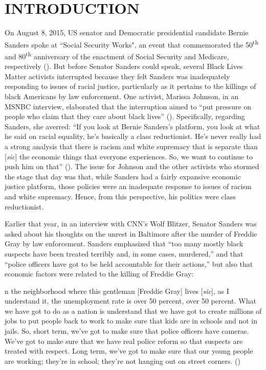 \documentclass[12pt]{article}
\renewenvironment{quote}
  {\list{}{\leftmargin=\parindent\rightmargin=0pt}%
   \item\relax}
  {\endlist}
\begin{document}

\section{INTRODUCTION}

On August 8, 2015, US senator and Democratic presidential candidate Bernie Sanders spoke at ``Social Security Works", an event that commemorated the 50\textsuperscript{th} and 80\textsuperscript{th} anniversary of the enactment of Social Security and Medicare, respectively (\cite{wilsonProtestersShutBernie2015}). But before Senator Sanders could speak, several Black Lives Matter activists interrupted because they felt Sanders was inadequately responding to issues of racial justice, particularly as it pertains to the killings of black Americans by law enforcement. One activist, Marissa Johnson, in an MSNBC interview, elaborated that the interruption aimed to “put pressure on people who claim that they care about black lives” (\cite{hallBernieSandersBlack2015}). Specifically, regarding Sanders, she averred: “If you look at Bernie Sanders’s platform, you look at what he said on racial equality, he’s basically a class reductionist. He’s never really had a strong analysis that there is racism and white supremacy that is separate than [\textit{sic}] the economic things that everyone experiences. So, we want to continue to push him on that” (\cite{hallBernieSandersBlack2015}). The issue for Johnson and the other activists who stormed the stage that day was that, while Sanders had a fairly expansive economic justice platform, those policies were an inadequate response to issues of racism and white supremacy. Hence, from this perspective, his politics were class reductionist.

Earlier that year, in an interview with CNN’s Wolf Blitzer, Senator Sanders was asked about his thoughts on the unrest in Baltimore after the murder of Freddie Gray by law enforcement. Sanders emphasized that “too many mostly black suspects have been treated terribly and, in some cases, murdered,” and that “police officers have got to be held accountable for their actions,” but also that economic factors were related to the killing of Freddie Gray:

\begin{quote}
[I]n the neighborhood where this gentleman [Freddie Gray] lives [\textit{sic}], as I understand it, the unemployment rate is over 50 percent, over 50 percent. What we have got to do as a nation is understand that we have got to create millions of jobs to put people back to work to make sure that kids are in schools and not in jails. So, short term, we've got to make sure that police officers have cameras. We've got to make sure that we have real police reform so that suspects are treated with respect. Long term, we've got to make sure that our young people are working; they're in school; they're not hanging out on street corners. (\cite{sandersInterviewWolfBlitzer2015})
\end{quote}
\end{document}
